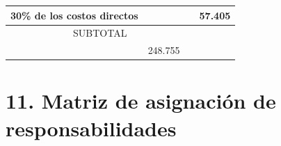 \documentclass[11pt]{charter}
\begin{document}
\begin{table}[H]
\begin{tabular}{|l|c|c|c|}
30\% de los costos directos                               & \multicolumn{1}{l|}{} & \multicolumn{1}{l|}{} & 57.405            \\ \hline
\multicolumn{3}{|c|}{SUBTOTAL}                                                                            &                  \\ \hline
\rowcolor[HTML]{C0C0C0} 
\multicolumn{3}{|c|}{\cellcolor[HTML]{C0C0C0}TOTAL}                                                       & 248.755           \\ \hline
\end{tabular}
\end{table}


\section{11. Matriz de asignación de responsabilidades}
\label{sec:responsabilidades}
\end{document}
